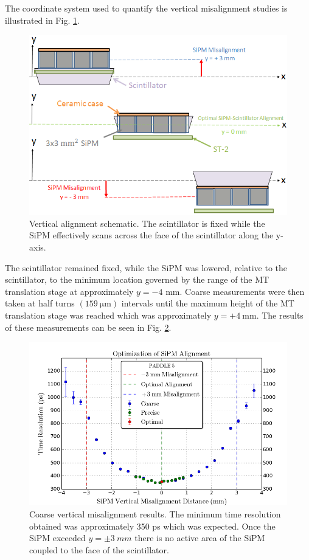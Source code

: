 The coordinate system used to quantify the vertical misalignment studies is illustrated in Fig. \ref{fig:sipm_va_schematic}.
\begin{figure}[!htb]
	\centering
	\includegraphics[width=1.0\columnwidth]{misalignment/figs/sipm_va_schematic}
	\caption{Vertical alignment schematic.  The scintillator is fixed while the SiPM effectively scans across the face of the scintillator along the y-axis.}
	\label{fig:sipm_va_schematic}
\end{figure}
The scintillator remained fixed, while the SiPM was lowered, relative to the scintillator, to the minimum location governed by the range of the MT translation stage at approximately $y = -4$ mm.  Coarse measurements were then taken at half turns $(159\ \mathrm{\mu m})$ intervals until the maximum height of the MT translation stage was reached which was approximately $y = +4\ \mathrm{mm}$.  The results of these measurements can be seen in Fig. \ref{fig:sipm_va_coarse}.
\begin{figure}[!htb]
	\centering
	\includegraphics[width=1.0\columnwidth]{misalignment/figs/sipm_va_coarse}
	\caption{Coarse vertical misalignment results.  The minimum time resolution obtained was approximately 350 ps which was expected.  Once the SiPM exceeded $y = \pm 3\ mm$ there is no active area of the SiPM coupled to the face of the scintillator.}
	\label{fig:sipm_va_coarse}
\end{figure}
